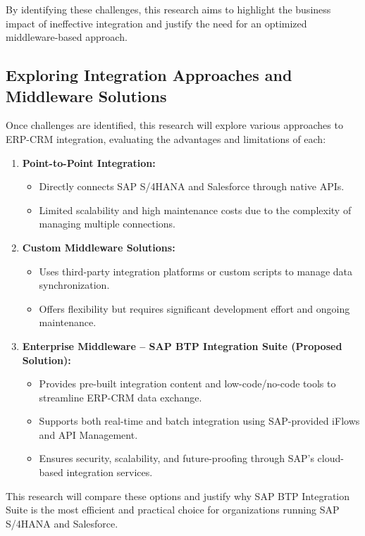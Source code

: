 By identifying these challenges, this research aims to highlight the business impact of ineffective integration and justify the need for an optimized middleware-based approach.

\subsection{Exploring Integration Approaches and Middleware Solutions}
Once challenges are identified, this research will explore various approaches to ERP-CRM integration, evaluating the advantages and limitations of each:

\begin{enumerate}
    \item \textbf{Point-to-Point Integration:}  
    \begin{itemize}
        \item Directly connects SAP S/4HANA and Salesforce through native APIs.
        \item Limited scalability and high maintenance costs due to the complexity of managing multiple connections.
    \end{itemize}
    
    \item \textbf{Custom Middleware Solutions:}
    \begin{itemize}
        \item Uses third-party integration platforms or custom scripts to manage data synchronization.
        \item Offers flexibility but requires significant development effort and ongoing maintenance.
    \end{itemize}

    \item \textbf{Enterprise Middleware – SAP BTP Integration Suite (Proposed Solution):}
    \begin{itemize}
        \item Provides pre-built integration content and low-code/no-code tools to streamline ERP-CRM data exchange.
        \item Supports both real-time and batch integration using SAP-provided iFlows and API Management.
        \item Ensures security, scalability, and future-proofing through SAP’s cloud-based integration services.
    \end{itemize}
\end{enumerate}

This research will compare these options and justify why SAP BTP Integration Suite is the most efficient and practical choice for organizations running SAP S/4HANA and Salesforce.

